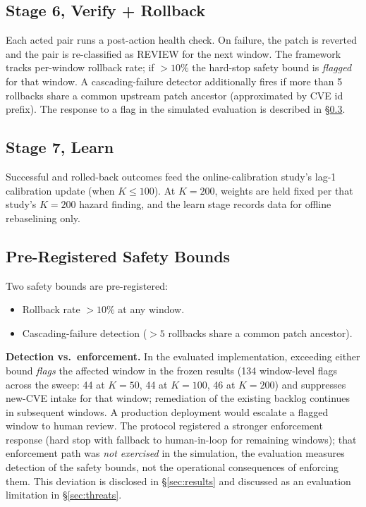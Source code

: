 \subsection{Stage 6, Verify + Rollback}

Each acted pair runs a post-action health check. On failure, the
patch is reverted and the pair is re-classified as REVIEW for the
next window. The framework tracks per-window rollback rate; if
$> 10\%$ the hard-stop safety bound is \emph{flagged} for that
window. A cascading-failure detector
additionally fires if more than 5 rollbacks share a common
upstream patch ancestor (approximated by CVE id prefix). The
response to a flag in the simulated evaluation is described in
\S\ref{sec:safety_bounds}.

\subsection{Stage 7, Learn}

Successful and rolled-back outcomes feed the online-calibration
study's lag-1 calibration update (when $K \leq 100$). At $K = 200$, weights are
held fixed per that study's $K = 200$ hazard finding, and the
learn stage records data for offline rebaselining only.

\subsection{Pre-Registered Safety Bounds}
\label{sec:safety_bounds}

Two safety bounds are pre-registered:

\begin{itemize}
\item Rollback rate $> 10\%$ at any window.
\item Cascading-failure detection ($> 5$ rollbacks share a common
patch ancestor).
\end{itemize}

\textbf{Detection vs.\ enforcement.} In the evaluated
implementation, exceeding either bound \emph{flags} the affected
window in the frozen results (134 window-level flags across the
sweep: 44 at $K = 50$, 44 at $K = 100$, 46 at $K = 200$) and
suppresses new-CVE intake for that window; remediation of the
existing backlog continues in subsequent windows. A production
deployment would escalate a flagged window to human review. The
protocol registered a stronger enforcement response (hard stop with
fallback to human-in-loop for remaining windows); that enforcement
path was \emph{not exercised} in the simulation, the evaluation
measures detection of the safety bounds, not the operational
consequences of enforcing them. This deviation is disclosed in
\S\ref{sec:results} and discussed as an evaluation limitation in
\S\ref{sec:threats}.
